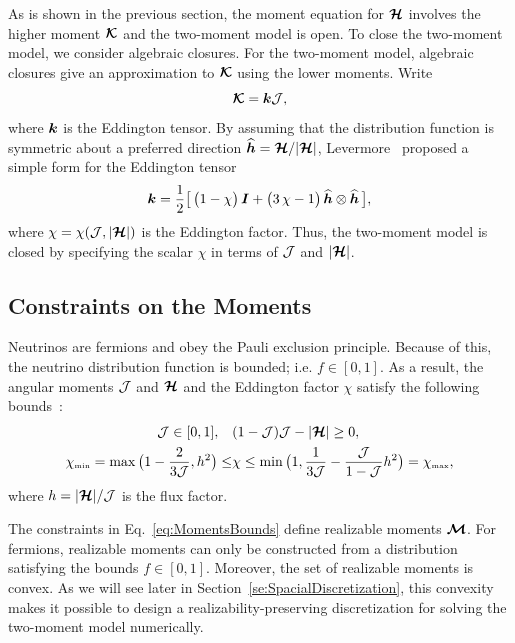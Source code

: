 As is shown in the previous section, the moment equation for $\boldsymbol{\mathcal{H}}$ involves the higher moment $\boldsymbol{\mathcal{K}}$ and the two-moment model is open.  
To close the two-moment model, we consider algebraic closures.  
For the two-moment model, algebraic closures give an approximation to $\boldsymbol{\mathcal{K}}$ using the lower moments.  
Write
\begin{equation}
  \boldsymbol{\mathcal{K}} = \boldsymbol{k} \mathcal{J},
\end{equation}
where $\boldsymbol{k}$ is the Eddington tensor.  
By assuming that the distribution function is symmetric about a preferred direction $\widehat{\boldsymbol{h}}=\boldsymbol{\mathcal{H}}/|\boldsymbol{\mathcal{H}}|$, Levermore~\cite{levermore_1984} proposed a simple form for the Eddington tensor
\begin{equation}
  \boldsymbol{k}=\frac{1}{2}\big[\,\big(1-\chi\big)\,\boldsymbol{I}+\big(3\,\chi-1\big)\,\widehat{\boldsymbol{h}}\otimes\widehat{\boldsymbol{h}}\,\big],
  \label{eq:eddingtonTensor}
\end{equation}
where $\chi=\chi(\mathcal{J},|\boldsymbol{\mathcal{H}}|)$ is the Eddington factor.  
Thus, the two-moment model is closed by specifying the scalar $\chi$ in terms of $\mathcal{J}$ and $|\boldsymbol{\mathcal{H}}|$.  

\subsection{Constraints on the Moments}

Neutrinos are fermions and obey the Pauli exclusion principle.  
Because of this, the neutrino distribution function is bounded; i.e. $f \in [0,1]$.
As a result, the angular moments $\mathcal{J}$ and $\boldsymbol{\mathcal{H}}$ and the Eddington factor $\chi$ satisfy the following bounds~\cite{levermore_1984,lareckiBanach_2011,kershaw_1976,shohatTamarkin_1943}: 
\begin{align}
\mathcal{J} \in[0,1], \quad &(1-\mathcal{J})\mathcal{J}-|\boldsymbol{\mathcal{H}}| \geq 0, \label{eq:MomentsBounds} \\
  \chi_{\mbox{\tiny min}}
  =\max\big(1-\frac{2}{3\mathcal{J}},h^{2}\big)
  \leq & \chi \leq \min\big(1,\frac{1}{3\mathcal{J}}-\frac{\mathcal{J}}{1-\mathcal{J}}h^{2}\big)=\chi_{\mbox{\tiny max}},
  \label{eq:eddingtonFactorBounds}
\end{align}
where $h = |\boldsymbol{\mathcal{H}}|/\mathcal{J}$ is the flux factor.  

The constraints in Eq.~\eqref{eq:MomentsBounds} define realizable moments $\boldsymbol{\mathcal{M}}$.  
For fermions, realizable moments can only be constructed from a distribution satisfying the bounds $f \in [0,1]$.  
Moreover, the set of realizable moments is convex.  
As we will see later in Section~\ref{se:SpacialDiscretization}, this convexity makes it possible to design a realizability-preserving discretization for solving the two-moment model numerically.

